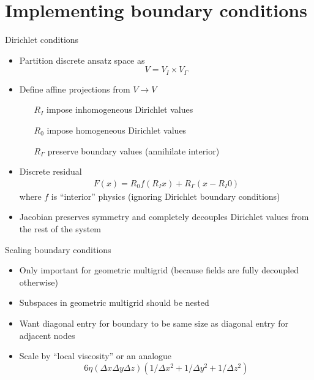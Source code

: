 \documentclass{beamer}
\begin{document}
\section{Implementing boundary conditions}
\begin{frame}{Dirichlet conditions}
  \begin{itemize}
  \item Partition discrete ansatz space as
    \[ V = V_I \times V_\Gamma \]
  \item Define affine projections from $V \to V$
    \begin{itemize}
    \item[$R_I$] impose inhomogeneous Dirichlet values
    \item[$R_0$] impose homogeneous Dirichlet values
    \item[$R_\Gamma$] preserve boundary values (annihilate interior)
    \end{itemize}
  \item Discrete residual
    \begin{gather*}
      F(x) = R_0 f(R_I x) + R_\Gamma (x - R_I 0)
    \end{gather*}
    where $f$ is ``interior'' physics (ignoring Dirichlet boundary conditions)
  \item Jacobian preserves symmetry and completely decouples Dirichlet
    values from the rest of the system
  \end{itemize}
\end{frame}

\begin{frame}{Scaling boundary conditions}
  \begin{itemize}
  \item Only important for geometric multigrid (because fields are fully decoupled otherwise)
  \item Subspaces in geometric multigrid should be nested
  \item Want diagonal entry for boundary to be same size as diagonal entry for adjacent nodes
  \item Scale by ``local viscosity'' or an analogue
    \[ 6 \eta (\Delta x \Delta y \Delta z)\left(1/\Delta x^2 + 1/\Delta y^2 + 1/\Delta z^2\right) \]
  \end{itemize}
\end{frame}

\def\uu{\bm u}
\def\LL{\mathcal L}
\def\di{\partial}
\end{document}
